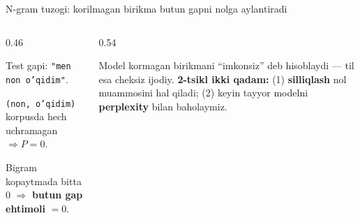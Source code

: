 \documentclass[aspectratio=169,11pt]{beamer}
\newcommand{\uzq}{\textquotesingle{}}
\begin{document}
\begin{frame}{N-gram tuzog\uzq{}i: ko\uzq{}rilmagan birikma butun gapni nolga aylantiradi}
\footnotesize

\begin{columns}[T,totalwidth=\textwidth]
\begin{column}{0.46\textwidth}
\begin{tcolorbox}[warnbox,title=Nol muammosi (\textit{zero problem})]
Test gapi: \texttt{"men non o'qidim"}.

\vspace{2pt}
\texttt{(non, o'qidim)} korpusda hech uchramagan $\Rightarrow P=0$.

\vspace{3pt}
Bigram ko\uzq{}paytmada bitta $0$ $\Rightarrow$ \textbf{butun gap ehtimoli} $=0$.
\end{tcolorbox}
\end{column}

\begin{column}{0.54\textwidth}
\centering
{}

\vspace{6pt}
\begin{tcolorbox}[okbox,left=2mm,right=2mm,top=1mm,bottom=1mm]
\scriptsize
Model ko\uzq{}rmagan birikmani ``imkonsiz'' deb hisoblaydi --- til esa cheksiz ijodiy.
\textbf{2-tsikl ikki qadam:} (1) \textbf{silliqlash} nol muammosini hal qiladi;
(2) keyin tayyor modelni \textbf{perplexity} bilan baholaymiz.
\end{tcolorbox}
\end{column}
\end{columns}

\end{frame}
\end{document}
